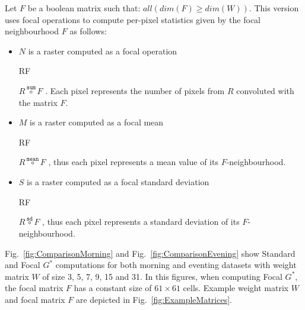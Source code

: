 \documentclass{itatnew}
\newcommand{\FOCALMMODE}[3]{
  #1{\stackrel{\mathtt{#3}}{\circ}}#2
}
\newcommand{\FOCAL}[3]{
  \ifmmode
  \FOCALMMODE{#1}{#2}{#3}
  \else
  \begin{math}\FOCALMMODE{#1}{#2}{#3}\end{math}%
  \fi
}
\begin{document}
\begin{definition}
  \label{def:FocalGetisOrdVersion}
  
  Let $F$ be a boolean matrix such that: $all(dim(F) \geq dim(W))$.
  This version uses focal operations to compute per-pixel statistics given by 
  the focal neighbourhood $F$ as follows:
  
  \begin{itemize}
    
    \item $N$ is a raster computed as a focal operation \FOCAL{R}{F}{sum}. Each
    pixel represents the number of pixels from $R$ convoluted with the matrix
    $F$. 
    
    \item $M$ is a raster computed as a focal mean \FOCAL{R}{F}{mean}, thus each
    pixel represents a mean value of its $F$-neighbourhood.
    
    \item $S$ is a raster computed as a focal standard deviation
    \FOCAL{R}{F}{sd}, thus each pixel represents a standard deviation of its
    $F$-neighbourhood.
    
  \end{itemize}
  
\end{definition}

Fig.~\ref{fig:ComparisonMorning} and Fig.~\ref{fig:ComparisonEvening} show
Standard and Focal $G^*$ computations for both morning and eventing datasets
with weight matrix $W$ of size 3, 5, 7, 9, 15 and 31. In this figures, when 
computing Focal
$G^*$, the focal matrix $F$ has a constant size of $61{\times}61$ cells. 
Example weight matrix $W$ and focal matrix $F$ are depicted in 
Fig.~\ref{fig:ExampleMatrices}.
\end{document}
